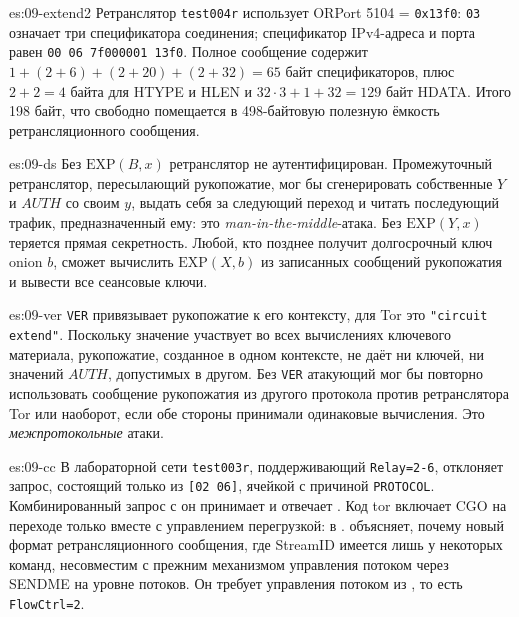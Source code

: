 \begin{soluzione}{es:09-extend2}
Ретранслятор \texttt{test004r} использует ORPort 5104 = \texttt{0x13f0}: \texttt{03} означает три спецификатора соединения; спецификатор IPv4-адреса и порта равен \texttt{00 06 7f000001 13f0}. Полное сообщение содержит $1 + (2+6) + (2+20) + (2+32) = 65$ байт спецификаторов, плюс $2 + 2 = 4$ байта для HTYPE и HLEN и $32 \cdot 3 + 1 + 32 = 129$ байт HDATA. Итого 198 байт, что свободно помещается в 498-байтовую полезную ёмкость ретрансляционного сообщения.
\end{soluzione}

\begin{soluzione}{es:09-ds}
Без $\mathrm{EXP}(B, x)$ ретранслятор не аутентифицирован. Промежуточный ретранслятор, пересылающий рукопожатие, мог бы сгенерировать собственные $Y$ и $\mathit{AUTH}$ со своим $y$, выдать себя за следующий переход и читать последующий трафик, предназначенный ему: это \emph{man-in-the-middle}-атака. Без $\mathrm{EXP}(Y, x)$ теряется прямая секретность. Любой, кто позднее получит долгосрочный ключ onion $b$, сможет вычислить $\mathrm{EXP}(X, b)$ из записанных сообщений рукопожатия и вывести все сеансовые ключи.
\end{soluzione}

\begin{soluzione}{es:09-ver}
\texttt{VER} привязывает рукопожатие к его контексту, для Tor это \texttt{"circuit extend"}. Поскольку значение участвует во всех вычислениях ключевого материала, рукопожатие, созданное в одном контексте, не даёт ни ключей, ни значений $\mathit{AUTH}$, допустимых в другом. Без \texttt{VER} атакующий мог бы повторно использовать сообщение рукопожатия из другого протокола против ретранслятора Tor или наоборот, если обе стороны принимали одинаковые вычисления. Это \emph{межпротокольные} атаки.
\end{soluzione}

\begin{soluzione}{es:09-cc}
В лабораторной сети \texttt{test003r}, поддерживающий \texttt{Relay=2-6}, отклоняет запрос, состоящий только из \texttt{[02 06]}, ячейкой  с причиной \texttt{PROTOCOL}. Комбинированный запрос с  он принимает и отвечает . Код tor включает CGO на переходе только вместе с управлением перегрузкой:  в .  объясняет, почему новый формат ретрансляционного сообщения, где StreamID имеется лишь у некоторых команд, несовместим с прежним механизмом управления потоком через SENDME на уровне потоков. Он требует управления потоком из , то есть \texttt{FlowCtrl=2}.
\end{soluzione}

